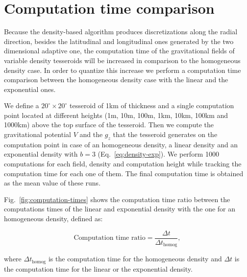 \documentclass[extra, referee]{gji}
\begin{document}

\section{Computation time comparison}

Because the density-based algorithm produces discretizations along the radial direction,
besides the latitudinal and longitudinal ones generated by the two dimensional adaptive
one, the computation time of the gravitational fields of variable density tesseroids
will be increased in comparison to the homogeneous density case.
In order to quantize this increase we perform a computation time comparison between the
homogeneous density case with the linear and the exponential ones.

We define a $20^\circ \times 20^\circ$ tesseroid of 1km of thickness and a single
computation point located at different heights (1m, 10m, 100m, 1km, 10km, 100km and
1000km) above the top surface of the tesseroid.
Then we compute the gravitational potential $V$ and the $g_z$ that the tesseroid
generates on the computation point in case of an homogeneous density, a linear density
and an exponential density with $b = 3$ (Eq.~\ref{eq:density-exp}).
We perform 1000 computations for each field, density and computation height while
tracking the computation time for each one of them.
The final computation time is obtained as the mean value of these runs.

Fig.~\ref{fig:computation-times} shows the computation time ratio between the
computations times of the linear and exponential density with the one for an homogeneous
density, defined as:

\begin{equation}
    \text{Computation time ratio} = \frac{\Delta t}{\Delta t_\text{homog}},
\end{equation}

\noindent where $\Delta t_\text{homog}$ is the computation time for the homogeneous
density and $\Delta t$ is the computation time for the linear or the exponential
density.
\end{document}
